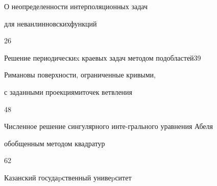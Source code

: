 

{О неопределенности интерполяционных задач


для неванлинновских\newline функций}{26}




{Решение периодическиx краевых задач методом подобластей}{39}




{Римановы поверхности, ограниченные кривыми,


с заданными проекциями\newline точек ветвления}{48}




{Численное решение сингулярного инте-\newline грального уравнения Абеля


обобщенным методом квадратур}{62}
















\vfill


\noindent\raisebox{2pt}{\copyright} Казанский госудаpственный унивеpситет





